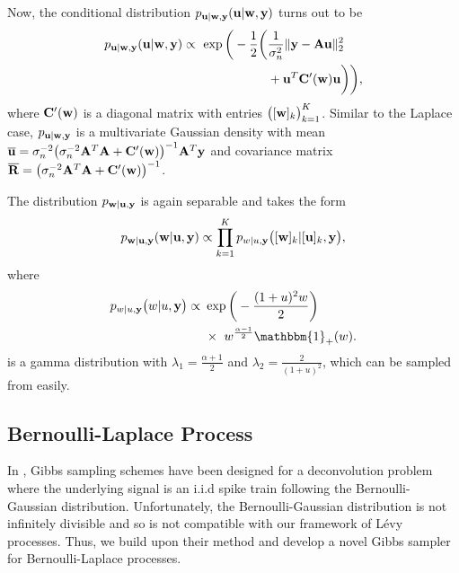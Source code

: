 \documentclass[journal]{IEEEtran}
\begin{document}
Now, the conditional distribution $p_{{\bf{u}} | {\bf{w}}, {\bf{y}}}({\bf{u}} | {\bf{w}}, {\bf{y}})$ turns out to be
\begin{align}\label{eq:conditional_u_student}
    p_{\M u | \M w, \M y}(\M u | \M w, \M y) \propto \ \exp\bigg(-\frac{1}{2}\bigg(&\frac{1}{\sigma_n^2}\|\M y - \M A \M u\|_{2}^{2} \nonumber \\
    & + \M u^{T} \M C'(\M w) \M u \bigg) \bigg),
\end{align}
where ${\bf{C}}'({\bf{w}})$ is a diagonal matrix with entries $\big([{\bf{w}}]_k\big)_{k=1}^{K}$. Similar to the Laplace case, $p_{{\bf{u}} | {\bf{w}}, {\bf{y}}}$ is a multivariate Gaussian density with mean $\overline{{\bf{u}}} = \sigma_n^{-2} \big(\sigma_n^{-2} {\bf{A}}^{T} {\bf{A}} + {\bf{C}}'({\bf{w}})\big)^{-1}{\bf{A}}^{T}{\bf{y}}$ and covariance matrix $\overline{{\bf{R}}} = \big(\sigma_n^{-2} {\bf{A}}^{T} {\bf{A}} + {\bf{C}}'({\bf{w}})\big)^{-1}$.

The distribution $p_{{\bf{w}} | {\bf{u}}, {\bf{y}}}$ is again separable and takes the form
\begin{equation}
    p_{{\bf{w}} | {\bf{u}}, {\bf{y}}}({\bf{w}} | {\bf{u}}, {\bf{y}}) \propto \prod_{k=1}^{K} p_{w|u, {\bf{y}}}\big([{\bf{w}}]_k|[{\bf{u}}]_k, {\bf{y}}\big),
\end{equation}
where
\begin{align}\label{eq:conditional_w_student}
    p_{w | u, \M y}\big(w | u, \M y\big) \propto \ &\exp\bigg(-\frac{(1 + u)^2 w}{2}\bigg) \nonumber \\
    &\times \ w^{\frac{\alpha-1}{2}} \mathbbm{1}_{+}(w).
\end{align}
is a gamma distribution with $\lambda_1 = \frac{\alpha + 1}{2}$ and $\lambda_2 = \frac{2}{(1 + u)^2}$, which can be sampled from easily.


\subsection{Bernoulli-Laplace Process}
In \cite{ge2011enhanced}, Gibbs sampling schemes have been designed for a deconvolution problem where the underlying signal is an i.i.d spike train following the Bernoulli-Gaussian distribution. Unfortunately, the Bernoulli-Gaussian distribution is not infinitely divisible and so is not compatible with our framework of L\'{e}vy processes. Thus, we build upon their method and develop a novel Gibbs sampler for Bernoulli-Laplace processes.
\end{document}

